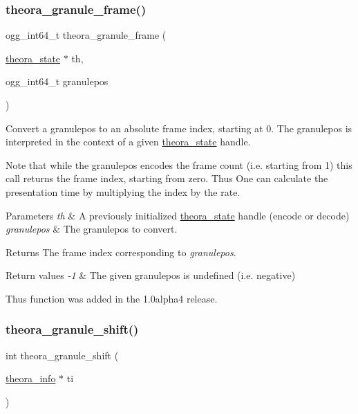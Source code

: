 \subsubsection{\texorpdfstring{theora\+\_\+granule\+\_\+frame()}{theora\_granule\_frame()}}
{\footnotesize\ttfamily ogg\+\_\+int64\+\_\+t theora\+\_\+granule\+\_\+frame (\begin{DoxyParamCaption}\item[{\hyperlink{structtheora__state}{theora\+\_\+state} $\ast$}]{th,  }\item[{ogg\+\_\+int64\+\_\+t}]{granulepos }\end{DoxyParamCaption})}

Convert a granulepos to an absolute frame index, starting at 0. The granulepos is interpreted in the context of a given \hyperlink{structtheora__state}{theora\+\_\+state} handle.

Note that while the granulepos encodes the frame count (i.\+e. starting from 1) this call returns the frame index, starting from zero. Thus One can calculate the presentation time by multiplying the index by the rate.


\begin{DoxyParams}{Parameters}
{\em th} & A previously initialized \hyperlink{structtheora__state}{theora\+\_\+state} handle (encode or decode) \\
\hline
{\em granulepos} & The granulepos to convert. \\
\hline
\end{DoxyParams}
\begin{DoxyReturn}{Returns}
The frame index corresponding to {\itshape granulepos}. 
\end{DoxyReturn}

\begin{DoxyRetVals}{Return values}
{\em -\/1} & The given granulepos is undefined (i.\+e. negative)\\
\hline
\end{DoxyRetVals}
Thus function was added in the 1.\+0alpha4 release. \mbox{\label{group__oldfuncs_gacd9360e6a47139c761002410af457a02}} 
\subsubsection{\texorpdfstring{theora\+\_\+granule\+\_\+shift()}{theora\_granule\_shift()}}
{\footnotesize\ttfamily int theora\+\_\+granule\+\_\+shift (\begin{DoxyParamCaption}\item[{\hyperlink{structtheora__info}{theora\+\_\+info} $\ast$}]{ti }\end{DoxyParamCaption})}

